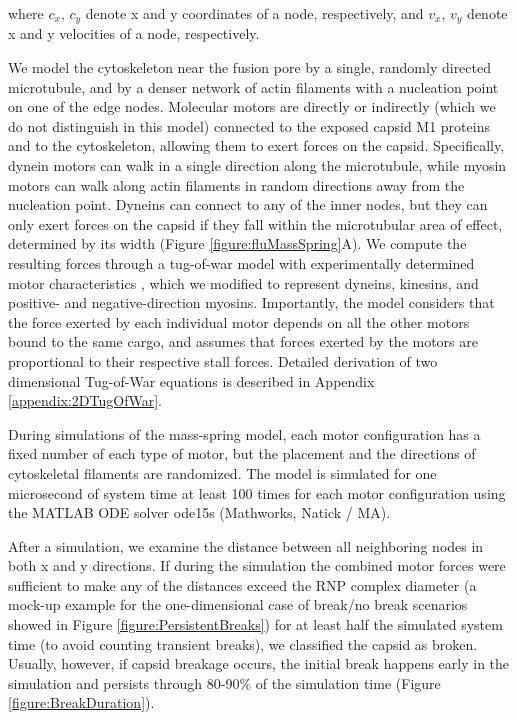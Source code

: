 where $c_x$, $c_y$ denote x and y coordinates of a node, respectively, and $v_x$, $v_y$ denote x and y velocities of a node, respectively. 

We model the cytoskeleton near the fusion pore by a single, randomly directed microtubule, and by a denser network of actin filaments with a nucleation point on one of the edge nodes. Molecular motors are directly or indirectly (which we do not distinguish in this model) connected to the exposed capsid M1 proteins and to the cytoskeleton, allowing them to exert forces on the capsid. Specifically, dynein motors can walk in a single direction along the microtubule, while myosin motors can walk along actin filaments in random directions away from the nucleation point. Dyneins can connect to any of the inner nodes, but they can only exert forces on the capsid if they fall within the microtubular area of effect, determined by its width (Figure \ref{figure:fluMassSpring}A).
We compute the resulting forces through a tug-of-war model with experimentally determined motor characteristics \cite{gennerich2007force, muller2008tug, norstrom2010unconventional}, which we modified to represent dyneins, kinesins, and positive- and negative-direction myosins. Importantly, the model considers that the force exerted by each individual motor depends on all the other motors bound to the same cargo, and assumes that forces exerted by the motors are proportional to their respective stall forces. Detailed derivation of two dimensional Tug-of-War equations is described in Appendix \ref{appendix:2DTugOfWar}.
 
During simulations of the mass-spring model, each motor configuration has a fixed number of each type of motor, but the placement and the directions of cytoskeletal filaments are randomized. The model is simulated for one microsecond of system time at least 100 times for each motor configuration using the MATLAB ODE solver ode15s (Mathworks, Natick / MA).

After a simulation, we examine the distance between all neighboring nodes in both x and y directions. If during the simulation the combined motor forces were sufficient to make any of the distances exceed the RNP complex diameter (a mock-up example for the one-dimensional case of break/no break scenarios showed in Figure \ref{figure:PersistentBreaks}) for at least half the simulated system time (to avoid counting transient breaks), we classified the capsid as broken. Usually, however, if capsid breakage occurs, the initial break happens early in the simulation and persists through 80-90\% of the simulation time (Figure \ref{figure:BreakDuration}).

